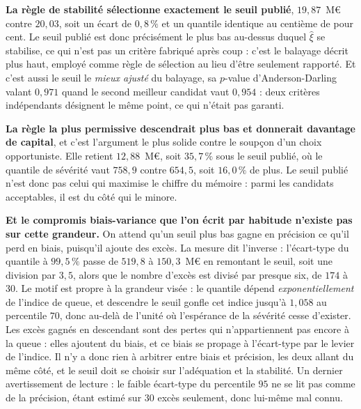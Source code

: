 \textbf{La règle de stabilité sélectionne exactement le seuil publié}, $19{,}87$~M\euro{} contre
$20{,}03$, soit un écart de $0{,}8\,\%$ et un quantile identique au centième de pour cent. Le
seuil publié est donc précisément le plus bas au-dessus duquel $\hat\xi$ se stabilise, ce qui
n'est pas un critère fabriqué après coup : c'est le balayage décrit plus haut, employé comme
règle de sélection au lieu d'être seulement rapporté. Et c'est aussi le seuil le \emph{mieux
ajusté} du balayage, sa $p$-value d'Anderson-Darling valant $0{,}971$ quand le second meilleur
candidat vaut $0{,}954$ : deux critères indépendants désignent le même point, ce qui n'était pas
garanti.

\textbf{La règle la plus permissive descendrait plus bas et donnerait davantage de capital}, et
c'est l'argument le plus solide contre le soupçon d'un choix opportuniste. Elle retient
$12{,}88$~M\euro, soit $35{,}7\,\%$ sous le seuil publié, où le quantile de sévérité vaut
$758{,}9$ contre $654{,}5$, soit $16{,}0\,\%$ de plus. Le seuil publié n'est donc pas celui qui
maximise le chiffre du mémoire : parmi les candidats acceptables, il est du côté qui le minore.

\begin{attention}
\textbf{Et le compromis biais-variance que l'on écrit par habitude n'existe pas sur cette
grandeur.} On attend qu'un seuil plus bas gagne en précision ce qu'il perd en biais, puisqu'il
ajoute des excès. La mesure dit l'inverse : l'écart-type du quantile à $99{,}5\,\%$ passe de
$519{,}8$ à $150{,}3$~M\euro{} en remontant le seuil, soit une division par $3{,}5$, alors que le
nombre d'excès est divisé par presque six, de $174$ à $30$. Le motif est propre à la grandeur
visée : le quantile dépend \emph{exponentiellement} de l'indice de queue, et descendre le seuil
gonfle cet indice jusqu'à $1{,}058$ au percentile $70$, donc au-delà de l'unité où l'espérance de
la sévérité cesse d'exister. Les excès gagnés en descendant sont des pertes qui n'appartiennent
pas encore à la queue : elles ajoutent du biais, et ce biais se propage à l'écart-type par le
levier de l'indice. Il n'y a donc rien à arbitrer entre biais et précision, les deux allant du
même côté, et le seuil doit se choisir sur l'adéquation et la stabilité. Un dernier avertissement
de lecture : le faible écart-type du percentile $95$ ne se lit pas comme de la précision, étant
estimé sur $30$ excès seulement, donc lui-même mal connu.
\end{attention}

